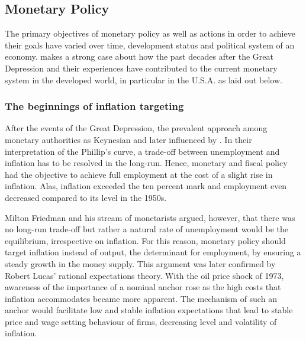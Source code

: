 
\subsection{Monetary Policy}

The primary objectives of monetary policy as well as actions in order to achieve their goals have varied over time, development status and  political system of an economy. \textcite{Mishkin.2007} makes a strong case about how the past decades after the Great Depression and their experiences have contributed to the current monetary system in the developed world, in particular in the U.S.A. as laid out below. 

\subsubsection{The beginnings of inflation targeting}
After the events of the Great Depression, the prevalent approach among monetary authorities as Keynesian and later influenced by \textcite{Samuelson.1960}. In their interpretation of the Phillip's curve, a trade-off between unemployment and inflation has to be resolved in the long-run. Hence, monetary and fiscal policy had the objective to achieve full employment at the cost of a slight rise in inflation. Alas, inflation exceeded the ten percent mark and employment even decreased compared to its level in the 1950s. 

Milton Friedman and his stream of monetarists argued, however, that there was no long-run trade-off but rather a natural rate of unemployment would be the equilibrium, irrespective on inflation. For this reason, monetary policy should target inflation instead of output, the determinant for employment, by ensuring a steady growth in the money supply. This argument was later confirmed by Robert Lucas' rational expectations theory. With the oil price shock of 1973, awareness of the importance of a nominal anchor rose as the high costs that inflation accommodates became more apparent. The mechanism of such an anchor would facilitate low and stable inflation expectations that lead to stable price and wage setting behaviour of firms, decreasing level and volatility of inflation.

